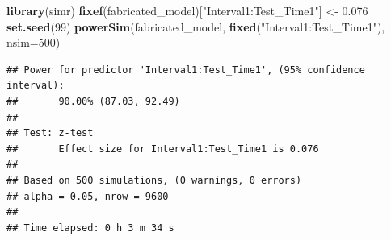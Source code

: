 \documentclass[
]{article}
\newenvironment{Shaded}{\begin{snugshade}}{\end{snugshade}}
\newcommand{\AttributeTok}[1]{\textcolor[rgb]{0.13,0.29,0.53}{#1}}
\newcommand{\DecValTok}[1]{\textcolor[rgb]{0.00,0.00,0.81}{#1}}
\newcommand{\FloatTok}[1]{\textcolor[rgb]{0.00,0.00,0.81}{#1}}
\newcommand{\FunctionTok}[1]{\textcolor[rgb]{0.13,0.29,0.53}{\textbf{#1}}}
\newcommand{\NormalTok}[1]{#1}
\newcommand{\OtherTok}[1]{\textcolor[rgb]{0.56,0.35,0.01}{#1}}
\newcommand{\StringTok}[1]{\textcolor[rgb]{0.31,0.60,0.02}{#1}}
\begin{document}
\begin{Shaded}
\begin{Highlighting}[]
\FunctionTok{library}\NormalTok{(simr)}
\FunctionTok{fixef}\NormalTok{(fabricated\_model)[}\StringTok{"Interval1:Test\_Time1"}\NormalTok{] }\OtherTok{\textless{}{-}} \FloatTok{0.076}
\FunctionTok{set.seed}\NormalTok{(}\DecValTok{99}\NormalTok{)}
\FunctionTok{powerSim}\NormalTok{(fabricated\_model, }\FunctionTok{fixed}\NormalTok{(}\StringTok{"Interval1:Test\_Time1"}\NormalTok{), }\AttributeTok{nsim=}\DecValTok{500}\NormalTok{)}
\end{Highlighting}
\end{Shaded}

\begin{verbatim}
## Power for predictor 'Interval1:Test_Time1', (95% confidence interval):
##       90.00% (87.03, 92.49)
## 
## Test: z-test
##       Effect size for Interval1:Test_Time1 is 0.076
## 
## Based on 500 simulations, (0 warnings, 0 errors)
## alpha = 0.05, nrow = 9600
## 
## Time elapsed: 0 h 3 m 34 s
\end{verbatim}
\end{document}
